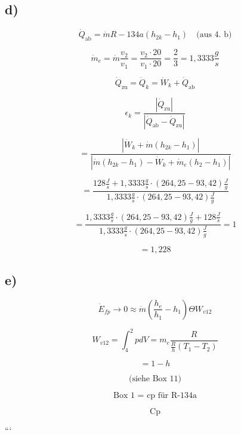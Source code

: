 

\subsection*{d)}

\[
\dot{Q}_{\text{ab}} = \dot{m} R-134a (h_{2k} - h_1) \quad \text{(aus 4. b)}
\]

\[
\dot{m}_e = \dot{m} \frac{v_2}{v_1} = \frac{v_2 \cdot 20}{v_1 \cdot 20} = \frac{2}{3} = 1,3333 \frac{g}{s}
\]

\[
\dot{Q}_{\text{zu}} = \dot{Q}_k = \dot{W}_k + \dot{Q}_{\text{ab}}
\]

\[
\epsilon_k = \frac{|\dot{Q}_{\text{zu}}|}{|\dot{Q}_{\text{ab}} - \dot{Q}_{\text{zu}}|}
\]

\[
= \frac{|\dot{W}_k + \dot{m} (h_{2k} - h_1)|}{|\dot{m} (h_{2k} - h_1) - \dot{W}_k + \dot{m}_e (h_2 - h_1)|}
\]

\[
= \frac{128 \frac{J}{s} + 1,3333 \frac{g}{s} \cdot (264,25 - 93,42) \frac{J}{g}}{1,3333 \frac{g}{s} \cdot (264,25 - 93,42) \frac{J}{g}}
\]

\[
= \frac{1,3333 \frac{g}{s} \cdot (264,25 - 93,42) \frac{J}{g} + 128 \frac{J}{s}}{1,3333 \frac{g}{s} \cdot (264,25 - 93,42) \frac{J}{g}} = 1
\]

\[
= 1,228
\]

\subsection*{e)}

\[
\dot{E}_{fp} \rightarrow 0 \approx \dot{m} \left( \frac{h_e}{h_1} - h_1 \right) \Theta W_{v12}
\]

\[
W_{v12} = \int_{4}^{2} p dV = m_e \frac{R}{\frac{R}{h} (T_1 - T_2)}
\]

\[
= 1 - h
\]

\[
\text{(siehe Box 11)}
\]

\[
\text{Box 1 = cp für R-134a}
\]

\[
\text{Cp}
\]

```